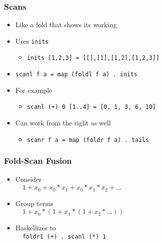 \documentclass{beamer}
\begin{document}
\begin{frame}[fragile]
    \frametitle{Scans}

\begin{itemize}
    \item Like a fold that shows its working
    \item Uses \verb?inits?
        \begin{itemize}
            \item \verb?inits [1,2,3] = [[],[1],[1,2],[1,2,3]]?
        \end{itemize}
    \item \verb?scanl f a = map (foldl f a) . inits?
    \item For example
        \begin{itemize}
            \item \verb?scanl (+) 0 [1..4] = [0, 1, 3, 6, 10]?
        \end{itemize}
    \item Can work from the right as well
        \begin{itemize}
            \item \verb?scanr f a = map (foldr f a) . tails?
        \end{itemize}
\end{itemize}

\end{frame}

\begin{frame}[fragile]
    \frametitle{Fold-Scan Fusion}

\begin{itemize}
    \item Consider\\ 
    \verb?  ?$1 + x_0 + x_0 * x_1 + x_0 * x_1 * x_2 + \ldots$\\
    \item Group terms\\
    \verb?  ?$1 + x_0 * (1 + x_1 * (1 + x_2 * \ldots))$\\
    \item Haskellizes to\\
    \verb?  foldr1 (+) . scanl (*) 1?\\
\end{itemize}

\end{frame}
\end{document}
